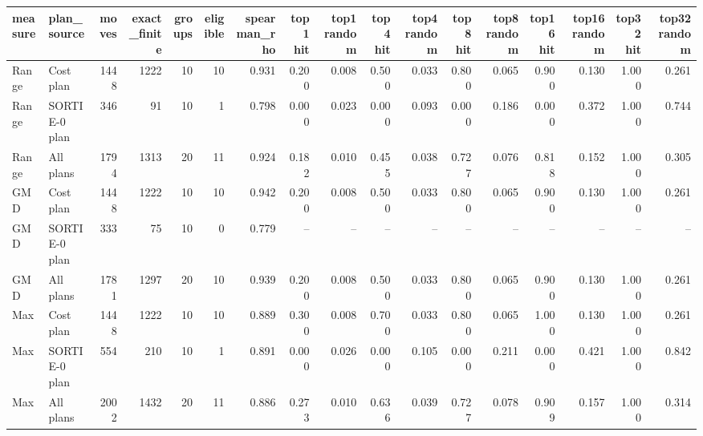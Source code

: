 \begin{tabular}{llrrrrrrrrrrrrrrr}
\toprule
measure & plan\_source & moves & exact\_finite & groups & eligible & spearman\_rho & top1 hit & top1 random & top4 hit & top4 random & top8 hit & top8 random & top16 hit & top16 random & top32 hit & top32 random \\
\midrule
Range & Cost plan & 1448 & 1222 & 10 & 10 & 0.931 & 0.200 & 0.008 & 0.500 & 0.033 & 0.800 & 0.065 & 0.900 & 0.130 & 1.000 & 0.261 \\
Range & SORTIE-0 plan & 346 & 91 & 10 & 1 & 0.798 & 0.000 & 0.023 & 0.000 & 0.093 & 0.000 & 0.186 & 0.000 & 0.372 & 1.000 & 0.744 \\
Range & All plans & 1794 & 1313 & 20 & 11 & 0.924 & 0.182 & 0.010 & 0.455 & 0.038 & 0.727 & 0.076 & 0.818 & 0.152 & 1.000 & 0.305 \\
GMD & Cost plan & 1448 & 1222 & 10 & 10 & 0.942 & 0.200 & 0.008 & 0.500 & 0.033 & 0.800 & 0.065 & 0.900 & 0.130 & 1.000 & 0.261 \\
GMD & SORTIE-0 plan & 333 & 75 & 10 & 0 & 0.779 & -- & -- & -- & -- & -- & -- & -- & -- & -- & -- \\
GMD & All plans & 1781 & 1297 & 20 & 10 & 0.939 & 0.200 & 0.008 & 0.500 & 0.033 & 0.800 & 0.065 & 0.900 & 0.130 & 1.000 & 0.261 \\
Max & Cost plan & 1448 & 1222 & 10 & 10 & 0.889 & 0.300 & 0.008 & 0.700 & 0.033 & 0.800 & 0.065 & 1.000 & 0.130 & 1.000 & 0.261 \\
Max & SORTIE-0 plan & 554 & 210 & 10 & 1 & 0.891 & 0.000 & 0.026 & 0.000 & 0.105 & 0.000 & 0.211 & 0.000 & 0.421 & 1.000 & 0.842 \\
Max & All plans & 2002 & 1432 & 20 & 11 & 0.886 & 0.273 & 0.010 & 0.636 & 0.039 & 0.727 & 0.078 & 0.909 & 0.157 & 1.000 & 0.314 \\
\bottomrule
\end{tabular}
